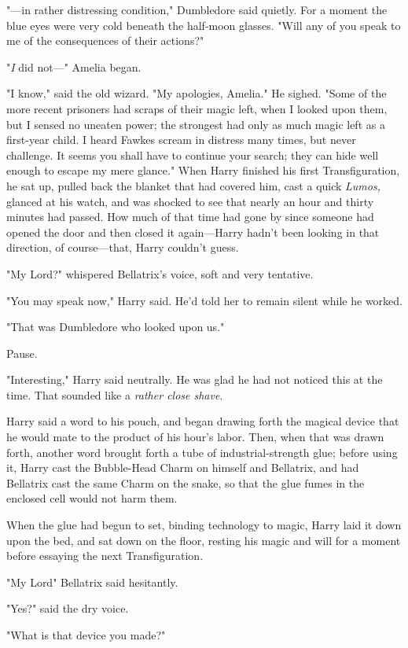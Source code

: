 "—in rather distressing condition," Dumbledore said quietly. For a moment the
blue eyes were very cold beneath the half-moon glasses. "Will any of you speak
to me of the consequences of their actions?"

"\emph{I} did not—" Amelia began.

"I know," said the old wizard. "My apologies, Amelia." He sighed. "Some of the
more recent prisoners had scraps of their magic left, when I looked upon them,
but I sensed no uneaten power; the strongest had only as much magic left as a
first-year child. I heard Fawkes scream in distress many times, but never
challenge. It seems you shall have to continue your search; they can hide well
enough to escape my mere glance."
\sbreak
When Harry finished his first Transfiguration, he sat up, pulled back the
blanket that had covered him, cast a quick \emph{Lumos,} glanced at his watch,
and was shocked to see that nearly an hour and thirty minutes had passed. How
much of that time had gone by since someone had opened the door and then closed
it again—Harry hadn't been looking in that direction, of course—that, Harry
couldn't guess.

"My Lord{\el}?" whispered Bellatrix's voice, soft and very tentative.

"You may speak now," Harry said. He'd told her to remain silent while he worked.

"That was Dumbledore who looked upon us."

Pause.

"Interesting," Harry said neutrally. He was glad he had not noticed this at the
time. That sounded like a \emph{rather close shave}.

Harry said a word to his pouch, and began drawing forth the magical device that
he would mate to the product of his hour's labor. Then, when that was drawn
forth, another word brought forth a tube of industrial-strength glue; before
using it, Harry cast the Bubble-Head Charm on himself and Bellatrix, and had
Bellatrix cast the same Charm on the snake, so that the glue fumes in the
enclosed cell would not harm them.

When the glue had begun to set, binding technology to magic, Harry laid it down
upon the bed, and sat down on the floor, resting his magic and will for a
moment before essaying the next Transfiguration.

"My Lord{\el}" Bellatrix said hesitantly.

"Yes?" said the dry voice.

"What is that device you made?"

